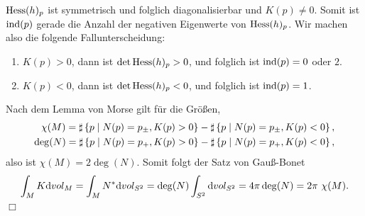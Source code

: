 \documentclass[12pt,a4paper]{article}
\def\#{\sharp}
\def\qed{\quad\hfill\ensuremath{\Box}}
\begin{document}
$\mathrm{Hess}(h)_p$ ist symmetrisch und folglich diagonalisierbar und $K(p)\neq 0$.
Somit ist $\mathrm{ind}(p)$ gerade die Anzahl der negativen Eigenwerte von $\mathrm{Hess}(h)_p$. Wir machen also die folgende
Fallunterscheidung:
\begin{enumerate}
  \item $K(p)  >0$, dann ist $\det \mathrm{Hess}(h)_p > 0$, und folglich ist
  $\mathrm{ind}(p)  = 0$ oder $2$.
  \item $K(p) < 0$, dann ist $\det \mathrm{Hess}(h)_p < 0$, und folglich ist $\mathrm{ind}(p) =
  1$.
\end{enumerate}
Nach dem Lemma von Morse gilt f\"ur die Gr\"o\ss{}en,
\begin{align*}
\chi(M) = \#\setdef{p}{N(p)=p_{\pm}, K(p) > 0}
-
\#\setdef{p}{N(p)=p_{\pm}, K(p) < 0},\\
\deg(N) = 
\#\setdef{p}{N(p)=p_{+}, K(p) > 0}
-
\#\setdef{p}{N(p)=p_{+}, K(p) < 0},
\end{align*}
also ist $\chi(M) = 2 \deg(N)$. Somit folgt der Satz von Gau\ss{}-Bonet
\begin{align*}
\int_M K\mathrm{d}vol_M = 
\int_M N^*\mathrm{d}vol_{S^2}
= \deg(N)\int_{S^2} \mathrm{d}vol_{S^2}
= 4\pi \deg(N)
= 2\pi\ \chi(M).
\end{align*}
\qed
\end{document}

